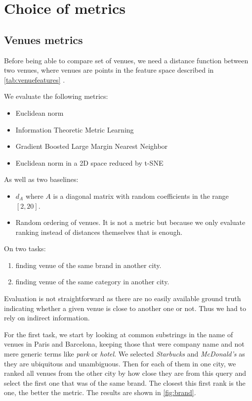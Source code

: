 \chapter{Choice of metrics}
\label{chap:metric}

\section{Venues metrics}
\label{sec:venues-metrics}

Before being able to compare set of venues, we need a distance function between
two venues, where venues are points in the feature space described in
\autoref{tab:venuefeatures} .

We evaluate the following metrics:
\begin{itemize}
	\item Euclidean norm
	\item Information Theoretic Metric Learning
	\item Gradient Boosted Large Margin Nearest Neighbor
	\item Euclidean norm in a 2D space reduced by t-SNE
\end{itemize}		
As well as two baselines:
\begin{itemize}
	\item $d_A$ where $A$ is a diagonal matrix with random coefficients in
		the range $[2, 20]$.
	\item Random ordering of venues. It is not a metric but because we
		only evaluate ranking instead of distances themselves that is
		enough.
\end{itemize}		
On two tasks:
\begin{enumerate}
	\item finding venue of the same brand in another city.
	\item finding venue of the same category in another city.
\end{enumerate}		

Evaluation is not straightforward as there are no easily available ground truth
indicating whether a given venue is close to another one or not. Thus we had to
rely on indirect information.

For the first task, we start by looking at common substrings in the name of venues
in Paris and Barcelona, keeping those that were company name and not mere
generic terms like \emph{park} or \emph{hotel}. We selected \emph{Starbucks} and
\emph{McDonald's} as they are ubiquitous and unambiguous. Then for each of
them in one city, we ranked all venues from the other city by how close they
are from this query and select the first one that was of the same brand. The
closest this first rank is the one, the better the metric. The results are
shown in \autoref{fig:brand}.

